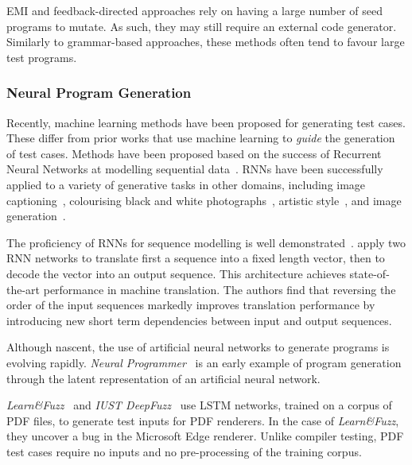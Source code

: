EMI and feedback-directed approaches rely on having a large number of seed programs to mutate. As such, they may still require an external code generator. Similarly to grammar-based approaches, these methods often tend to favour large test programs.


\subsubsection{Neural Program Generation}
\label{subsec:related-work-neural-program-generation}

Recently, machine learning methods have been proposed for generating test cases. These differ from prior works that use machine learning to \emph{guide} the generation of test cases.
Methods have been proposed based on the success of Recurrent Neural Networks at modelling sequential data~\cite{Jozefowicz2016a}. RNNs have been successfully applied to a variety of generative tasks in other domains, including image captioning~\cite{Vinyals}, colourising black and white photographs~\cite{Zhang2016}, artistic style~\cite{Gatys2015}, and image generation~\cite{Gregor2014}.

The proficiency of RNNs for sequence modelling is well demonstrated~\cite{Sutskever2014}. \citeauthor{Sutskever2014} apply two RNN networks to translate first a sequence into a fixed length vector, then to decode the vector into an output sequence. This architecture achieves state-of-the-art performance in machine translation. The authors find that reversing the order of the input sequences markedly improves translation performance by introducing new short term dependencies between input and output sequences.

Although nascent, the use of artificial neural networks to generate programs is evolving rapidly. \emph{Neural Programmer}~\cite{Neelakantan2016} is an early example of program generation through the latent representation of an artificial neural network.

%
\emph{Learn\&Fuzz}~\cite{Godefroid2017} and \emph{IUST DeepFuzz}~\cite{Nasrabadi2018} use LSTM networks, trained on a corpus of PDF files, to generate test inputs for PDF renderers. In the case of \emph{Learn\&Fuzz}, they uncover a bug in the Microsoft Edge renderer. Unlike compiler testing, PDF test cases require no inputs and no pre-processing of the training corpus.

